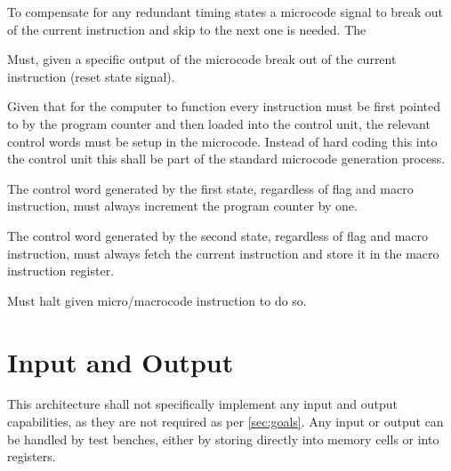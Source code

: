To compensate for any redundant timing states a microcode signal to break out of the current instruction and skip to the next one is needed. The 

\begin{feat-requirement}
  Must, given a specific output of the microcode break out of the current instruction (reset state signal).
\end{feat-requirement}


Given that for the computer to function every instruction must be first pointed to by the program counter and then loaded into the control unit, the relevant control words must be setup in the microcode. Instead of hard coding this into the control unit this shall be part of the standard microcode generation process.
\begin{feat-requirement}
  The control word generated by the first state, regardless of flag and macro instruction, must always increment the program counter by one. 
\end{feat-requirement}

\begin{feat-requirement}
  The control word generated by the second state, regardless of flag and macro instruction, must always fetch the current instruction and store it in the macro instruction register.
\end{feat-requirement}


\begin{feat-requirement}
  Must halt given micro/macrocode instruction to do so. 
\end{feat-requirement}

\section{Input and Output}
This architecture shall not specifically implement any input and output capabilities, as they are not required as per \ref{sec:goals}. Any input or output can be handled by test benches, either by storing directly into memory cells or into registers.